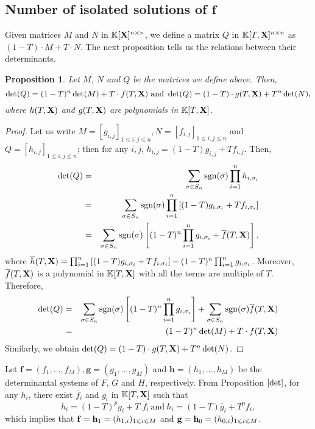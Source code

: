 \documentclass[11pt]{article}
\numberwithin{Property}{section}
\numberwithin{Theorem}{section}
\newtheorem{Proposition}{Proposition}%
\numberwithin{Proposition}{section}
\numberwithin{Lemma}{section}
\numberwithin{Corollary}{section}
\numberwithin{Definition}{section}
\numberwithin{Remark}{section}
\numberwithin{Conjecture}{section}
\numberwithin{Problem}{section}
\numberwithin{Claim}{section}
\theoremstyle{definition}
\numberwithin{Example}{section}
\def\f {\ensuremath{\mathbf{f}}}
\def\h {\ensuremath{\mathbf{h}}}
\def\g {\ensuremath{\mathbf{g}}}
\renewcommand{\leq}{\leqslant}
\def\bar{\overline}
\newcommand{\field}{\mathbb{K}} %
\newcommand{\mat}[1]{\mathbf{\MakeUppercase{#1}}} %
\begin{document}
\subsection{Number of isolated solutions of $\f$}
Given matrices $M$ and $N$ in $\field[\mat{X}]^{n \times n}$, we define a matrix $Q$ in $\field[T, \mat{X}]^{n \times n}$ as $(1-T)\cdot M + T\cdot N$. The next proposition tells us the relations between their determinants. 
\begin{Proposition}\label{det} Let $M$, $N$ and $Q$ be the matrices we define above. Then,
\[
\det(Q) = (1-T)^n \det(M) + T\cdot f(T,\mat{X}) \ \mathrm{and} \ \det(Q) = (1-T)\cdot g(T,\mat{X}) + T^n \det(N),
\] where $h(T,\mat{X})$ and $g(T,\mat{X})$ are polynomials in $\field[T,\mat{X}]$.
\end{Proposition}
\begin{proof}
Let us write $M = [g_{i,j}]_{1 \leq i,j \leq n}, N = [f_{i,j}]_{1 \leq i,j \leq n}$ and $Q = [h_{i,j}]_{1 \leq i,j \leq n}$; then for any $i,j$,  $h_{i,j} = (1-T)g_{i,j} + Tf_{i,j}$. Then,
\begin{eqnarray*}
\det(Q) &=& \sum_{\sigma \in S_n}\mathrm{sgn}(\sigma)\prod_{i = 1}^nh_{i,\sigma_i}\\
&=& \sum_{\sigma \in S_n}\mathrm{sgn}(\sigma)\prod_{i = 1}^n\left[(1-T)g_{i,\sigma_i} + Tf_{i,\sigma_i}\right]\\
&=& \sum_{\sigma \in S_n}\mathrm{sgn}(\sigma)\left[(1-T)^n\prod_{i = 1}^ng_{i,\sigma_i} + \bar{f}(T,\mat{X})\right],
\end{eqnarray*}
where $\bar{h}(T,\mat{X}) = \prod_{i = 1}^n\left[(1-T)g_{i,\sigma_i} + Tf_{i,\sigma_i}\right] - (1-T)^n\prod_{i = 1}^ng_{i,\sigma_i}$. Moreover, $\bar{f}(T,\mat{X})$ is a polynomial in $\field[T, \mat{X}]$ with all the terms are multiple of $T$. Therefore, 
\begin{eqnarray*}
\det(Q) &=&  \sum_{\sigma \in S_n}\mathrm{sgn}(\sigma)\left[(1-T)^n\prod_{i = 1}^ng_{i,\sigma_i}\right] + \sum_{\sigma \in S_n}\mathrm{sgn}(\sigma)\bar{f}(T,\mat{X}) \\
&=& (1-T)^n\det(M) + T \cdot f(T,\mat{X})
\end{eqnarray*}
Similarly, we obtain $\det(Q) = (1-T)\cdot g(T,\mat{X}) + T^n\det(N)$.

\end{proof}

Let $\f = (f_1, \ldots, f_M), \g = (g_1, \ldots, g_M)$ and $\h = (h_1, \ldots, h_M)$ be the determinantal systems of $F$, $G$ and $H$, respectively. From Proposition $\ref{det}$, for any $h_i$, there exist $\bar{f}_i$ and $\bar{g}_i$ in $\field[T, \mat{X}]$ such that 
\begin{equation} \label{deteq}
h_i = (1-T)^pg_i + T.\bar{f}_{i} \ \mathrm{and} \ h_i = (1-T)\bar{g}_i + T^pf_i,
\end{equation}
which implies that ${\bf{f}} = {\bf{h}}_1 = (h_{1,i})_{1 \leq i \leq M}$ and ${\bf{g}} = {\bf{h}}_0 = (h_{0,i})_{1 \leq i \leq M}$.\
\end{document}
